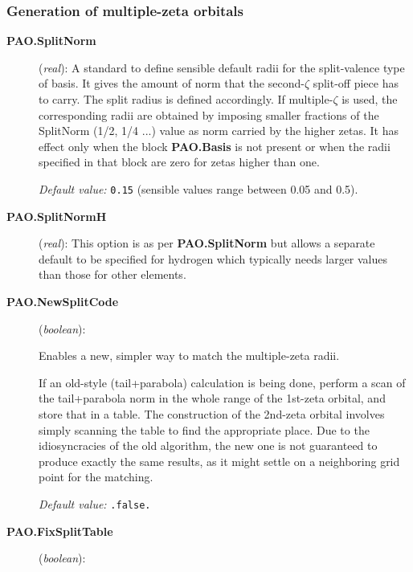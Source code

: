 \documentclass[11pt]{article}
\begin{document}
\subsubsection{Generation of multiple-zeta orbitals}
\begin{description}

\item[{\bf PAO.SplitNorm}] ({\it real}): 
A standard to define sensible default
radii for the split-valence type of basis. It gives the amount of norm that
the second-$\zeta$ split-off piece has to carry. The split radius is defined
accordingly. If multiple-$\zeta$ 
is used, the corresponding radii are obtained
by imposing smaller fractions of the SplitNorm (1/2, 1/4 ...) value as
norm carried by the higher zetas. It has effect only when the block
{\bf PAO.Basis} is not present or when the radii
specified in that block are zero for zetas higher than one.

{\it Default value:} {\tt 0.15} (sensible values range between 0.05 and 0.5).

\item[{\bf PAO.SplitNormH}] ({\it real}):
This option is as per {\bf PAO.SplitNorm} but allows a separate
default to be
specified for hydrogen which typically needs larger values than those
for other
elements.

\item[{\bf PAO.NewSplitCode}] ({\it boolean}): 

Enables a new, simpler way to match the multiple-zeta radii.

If an old-style (tail+parabola) calculation is being done, perform a
scan of the tail+parabola norm in the whole range of the 1st-zeta
orbital, and store that in a table. The construction of the
2nd-zeta orbital involves simply scanning the table to find the
appropriate place. Due to the idiosyncracies of the old algorithm,
the new one is not guaranteed to produce exactly the same results,
as it might settle on a neighboring grid point for the matching.

{\it Default value:} {\tt .false.}

\item[{\bf PAO.FixSplitTable}] ({\it boolean}): 


\end{description}
\end{document}
